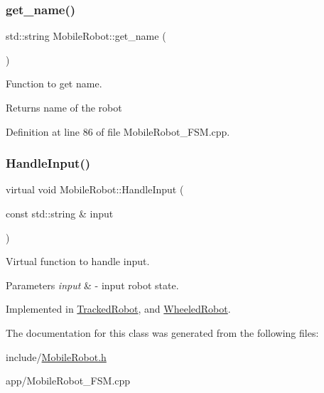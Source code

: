 \subsubsection{\texorpdfstring{get\_name()}{get\_name()}}
{\footnotesize\ttfamily std\+::string Mobile\+Robot\+::get\+\_\+name (\begin{DoxyParamCaption}{ }\end{DoxyParamCaption})}



Function to get name. 

\begin{DoxyReturn}{Returns}
name of the robot 
\end{DoxyReturn}


Definition at line 86 of file Mobile\+Robot\+\_\+\+F\+S\+M.\+cpp.

\mbox{\label{class_mobile_robot_a703aa7c008b6e9b5beb5017e7a6d020e}} 
\subsubsection{\texorpdfstring{HandleInput()}{HandleInput()}}
{\footnotesize\ttfamily virtual void Mobile\+Robot\+::\+Handle\+Input (\begin{DoxyParamCaption}\item[{const std\+::string \&}]{input }\end{DoxyParamCaption})\hspace{0.3cm}{\ttfamily [pure virtual]}}



Virtual function to handle input. 


\begin{DoxyParams}{Parameters}
{\em input} & -\/ input robot state. \\
\hline
\end{DoxyParams}


Implemented in \mbox{\hyperlink{class_tracked_robot_a3522a61808d4bb1eb1779c9b8589b8f0}{Tracked\+Robot}}, and \mbox{\hyperlink{class_wheeled_robot_a481731d5b59ed97b432aac14de6036fd}{Wheeled\+Robot}}.



The documentation for this class was generated from the following files\+:\begin{DoxyCompactItemize}
\item 
include/\mbox{\hyperlink{_mobile_robot_8h}{Mobile\+Robot.\+h}}\item 
app/Mobile\+Robot\+\_\+\+F\+S\+M.\+cpp\end{DoxyCompactItemize}
